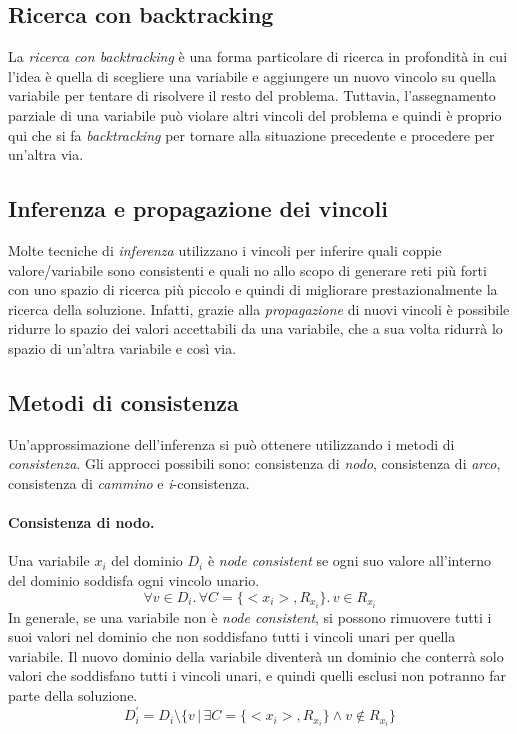\documentclass[11pt,oneside]{book}
\begin{document}
\subsection{Ricerca con backtracking}
La \textit{ricerca con backtracking} è una forma particolare di ricerca in profondità in cui l'idea è quella di scegliere una variabile e aggiungere un nuovo vincolo su quella variabile per tentare di risolvere il resto del problema. Tuttavia, l'assegnamento parziale di una variabile può violare altri vincoli del problema e quindi è proprio qui che si fa \textit{backtracking} per tornare alla situazione precedente e procedere per un'altra via.

\subsection{Inferenza e propagazione dei vincoli}
Molte tecniche di \textit{inferenza} utilizzano i vincoli per inferire quali coppie valore/variabile sono consistenti e quali no allo scopo di generare reti più forti con uno spazio di ricerca più piccolo e quindi di migliorare prestazionalmente la ricerca della soluzione. Infatti, grazie alla \textit{propagazione} di nuovi vincoli è possibile ridurre lo spazio dei valori accettabili da una variabile, che a sua volta ridurrà lo spazio di un'altra variabile e così via.

\subsection{Metodi di consistenza}
Un'approssimazione dell'inferenza si può ottenere utilizzando i metodi di \textit{consistenza}. Gli approcci possibili sono: consistenza di \textit{nodo}, consistenza di \textit{arco}, consistenza di \textit{cammino} e \textit{i}-consistenza.

\paragraph{Consistenza di nodo.}
Una variabile $x_i$ del dominio $D_i$ è \textit{node consistent} se ogni suo valore all'interno del dominio soddisfa ogni vincolo unario.
\[ \forall v \in D_i. \, \forall C = \{ <x_i>, R_{x_i} \}. \, v \in R_{x_i} \]
In generale, se una variabile non è \textit{node consistent}, si possono rimuovere tutti i suoi valori nel dominio che non soddisfano tutti i vincoli unari per quella variabile. Il nuovo dominio della variabile diventerà un dominio che conterrà solo valori che soddisfano tutti i vincoli unari, e quindi quelli esclusi non potranno far parte della soluzione.
\[ D^{'}_i = D_i \setminus \{ v \, | \, \exists C = \{ <x_i>, R_{x_i} \} \wedge v \notin R_{x_i}  \} \]
\end{document}
